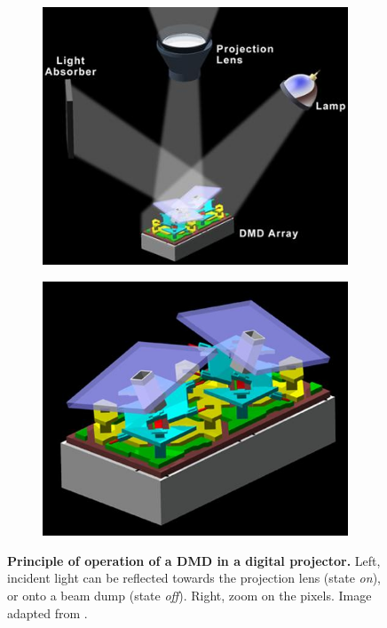 \documentclass[12pt]{iopart}
\begin{document}
\begin{figure}
  \centering
  \begin{subfigure}{0.49\textwidth}
    \centering
    \includegraphics[width = \textwidth]{images/pixel_1.jpg}
    \label{fig:pix_left}
  \end{subfigure}
  \begin{subfigure}{0.49\textwidth}
    \centering
    \includegraphics[width = \textwidth]{images/pixel_2.jpg}
    \label{fig:pix_right}
  \end{subfigure}
  \caption{
    \textbf{Principle of operation of a DMD in a digital projector.}
    Left, incident light can be reflected towards the projection lens (state {\em on}),
    or onto a beam dump (state {\em off}).
    Right, zoom on the pixels.
    Image adapted from \cite{JacksonDMD}.
  }
  \label{fig:combined_pixel}
\end{figure}
\end{document}
